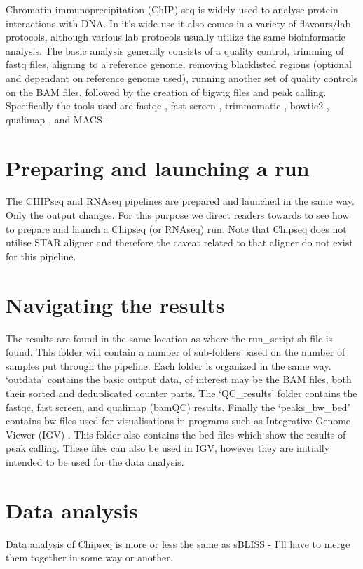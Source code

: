 \label{chap:CHIPseq}
Chromatin immunoprecipitation (ChIP) seq is widely used to analyse protein interactions with DNA. In it's wide use it also comes in a variety of flavours/lab protocols, although various lab protocols usually utilize the same bioinformatic analysis. The basic analysis generally consists of a quality control, trimming of fastq files, aligning to a reference genome, removing blacklisted regions (optional and dependant on reference genome used), running another set of quality controls on the BAM files, followed by the creation of bigwig files and peak calling. Specifically the tools used are fastqc \cite{fastqc}, fast screen \cite{fast_screen}, trimmomatic \cite{bolger2014trimmomatic}, bowtie2 \cite{bowtie2}, qualimap \cite{qualimap,qualimap2}, and MACS \cite{MACS3}.

\section{Preparing and launching a run \label{sec:run_prep_CHIP}}
The CHIPseq and RNAseq pipelines are prepared and launched in the same way. Only the output changes. For this purpose we direct readers towards  to see how to prepare and launch a Chipseq (or RNAseq) run. Note that Chipseq does not utilise STAR aligner and therefore the caveat related to that aligner do not exist for this pipeline.

\section{Navigating the results}
The results are found in the same location as where the run\_script.sh file is found. This folder will contain a number of sub-folders based on the number of samples put through the pipeline. Each folder is organized in the same way. `outdata' contains the basic output data, of interest may be the BAM files, both their sorted and deduplicated counter parts. The `QC\_results' folder contains the fastqc, fast screen, and qualimap (bamQC) results. Finally the `peaks\_bw\_bed' contains bw files used for visualisations in programs such as Integrative Genome Viewer (IGV) \cite{thorvaldsdottir2013integrative}. This folder also contains the bed files which show the results of peak calling. These files can also be used in IGV, however they are initially intended to be used for the data analysis.
\section{Data analysis \label{sec:chip_data_analysis}}
Data analysis of Chipseq is more or less the same as sBLISS - I'll have to merge them together in some way or another.